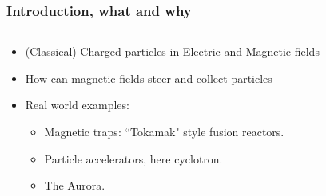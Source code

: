 \documentclass{beamer}
\begin{document}
\begin{frame}
\frametitle{Introduction, what and why}
\begin{columns}
\begin{column}{0.5\linewidth}
\begin{itemize}
\item<1-> (Classical) Charged particles in Electric and Magnetic fields
\item<2-> How can magnetic fields steer and collect particles
\item<3-> Real world examples:
\begin{itemize}
\item<3-> Magnetic traps: ``Tokamak" style fusion reactors.
\item<4-> Particle accelerators, here cyclotron.
\item<5-> The Aurora.
\end{itemize}
\end{itemize}
\end{column}
\begin{column}{0.5\linewidth}


\end{column}
\end{columns}
\end{frame}
\end{document}
